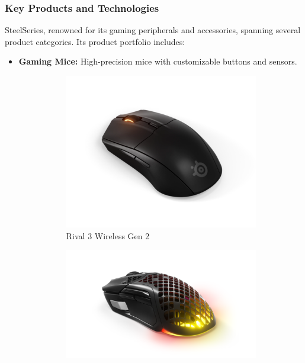 \subsubsection{Key Products and Technologies}
SteelSeries, renowned for its gaming peripherals and accessories, spanning several product categories. Its product portfolio includes:
\begin{itemize}
    \item \textbf{Gaming Mice:} High-precision mice with customizable buttons and sensors.
    \begin{figure}[h!]
    \centering
    \begin{subfigure}[b]{0.25\textwidth}
        \includegraphics[width=\textwidth]{ressources/mouse_1.png}
        \caption{Rival 3 Wireless Gen 2}
    \end{subfigure}
    \hfill
    \begin{subfigure}[b]{0.25\textwidth}
        \includegraphics[width=\textwidth]{ressources/mouse_2.png}

\end{subfigure}
\end{figure}
\end{itemize}
